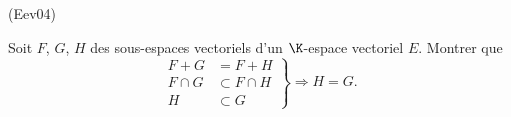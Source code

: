 \begin{tiny}(Eev04)\end{tiny} Soit $F$, $G$, $H$ des sous-espaces vectoriels d'un $\K$-espace vectoriel $E$. Montrer que
\[
 \left. 
 \begin{aligned}
  F + G &= F + H \\
  F \cap G &\subset F\cap H \\
  H &\subset G
 \end{aligned}
\right\rbrace \Rightarrow H = G.
\]

